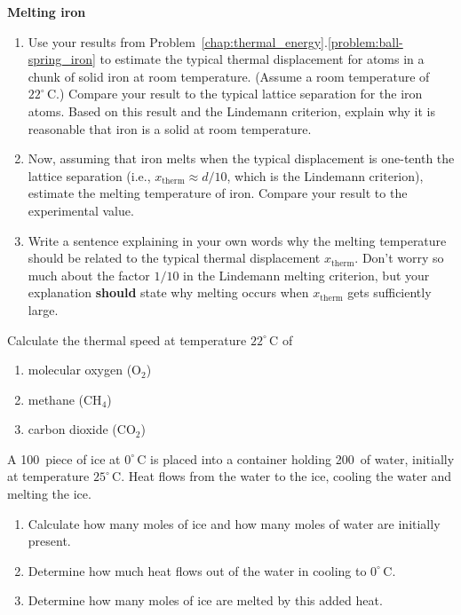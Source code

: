 \begin{exercise} \textbf{Melting iron}
  \begin{enumerate}
  \item Use your results from
    Problem~\ref{chap:thermal_energy}.\ref{problem:ball-spring_iron}
    to estimate the typical thermal displacement for atoms in a chunk
    of solid iron at room temperature.  (Assume a room temperature of
    $22^{\circ}\,\text{C}$.)  Compare your result to the typical
    lattice separation for the iron atoms.  Based on this result and
    the Lindemann criterion, explain why it is reasonable that iron is
    a solid at room temperature.

  \item Now, assuming that iron melts when the typical displacement is
    one-tenth the lattice separation (i.e., $x_\text{therm} \approx
    d/10$, which is the Lindemann criterion), estimate the melting
    temperature of iron.  Compare your result to the experimental
    value.

  \item Write a sentence explaining in your own words why the melting
    temperature should be related to the typical thermal displacement
    $x_\text{therm}$.  Don't worry so much about the factor $1/10$ in
    the Lindemann melting criterion, but your explanation \textbf{should}
    state why melting occurs when $x_\text{therm}$ gets sufficiently large.
  \end{enumerate}
\label{problem:iron_melting}
\end{exercise}


\begin{exercise}
Calculate the thermal speed at temperature $22^\circ\,\text{C}$ of
\begin{enumerate}
\item molecular oxygen (O$_2$)
\item methane (CH$_4$)
\item carbon dioxide (CO$_2$)
\end{enumerate}
\label{problem:thermal_speeds}
\end{exercise}

\begin{exercise}
A 100\, piece of ice at $0^\circ\,\text{C}$ is placed into a
container holding 200\, of water, initially at temperature
$25^\circ\,\text{C}$.  Heat flows from the water to the ice, cooling the water
and melting the ice. 
\begin{enumerate}
\item Calculate how many moles of ice and how many moles of water are
initially present.
\item  Determine how much 
heat flows out of the water in cooling to  $0^\circ\,\text{C}$.
\item Determine how many moles of ice are melted by this added heat.
\end{enumerate}
\label{problem:water_calorimetry}
\end{exercise}

